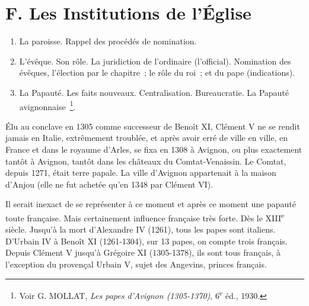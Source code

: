 \documentclass[french,twoside]{book} %
\begin{document}
\section[{F. Les Institutions de l’Église}]{F. Les Institutions de l’Église}
\label{c10f}

\begin{enumerate}[itemsep=0pt,]
\item La paroisse. Rappel des procédés de nomination.
\item L’évêque. Son rôle. La juridiction de l’ordinaire (l’official). Nomination des évêques, l’élection par le chapitre ; le rôle du roi ; et du pape (indications).
\item La Papauté. Les faits nouveaux. Centralisation. Bureaucratie. La Papauté avignonnaise \footnote{ Voir G. MOLLAT, {\itshape Les papes d’Avignon (1305-1370)}, 6\textsuperscript{e} éd., 1930.}.
\end{enumerate}

\noindent Élu au conclave en 1305 comme successeur de Benoît XI, Clément V ne se rendit jamais en Italie, extrêmement troublée, et après  
\label{p113} avoir erré de ville en ville, en France et dans le royaume d’Arles, se fixa en 1308 à Avignon, ou plus exactement tantôt à Avignon, tantôt dans les châteaux du Comtat-Venaissin. Le Comtat, depuis 1271, était terre papale. La ville d’Avignon appartenait à la maison d’Anjou (elle ne fut achetée qu’en 1348 par Clément VI).\par
Il serait inexact de se représenter à ce moment et après ce moment une papauté toute française. Mais certainement influence française très forte. Dès le XIII\textsuperscript{e} siècle. Jusqu’à la mort d’Alexandre IV (1261), tous les papes sont italiens. D’Urbain IV à Benoît XI (1261-1304), sur 13 papes, on compte trois français. Depuis Clément V jusqu’à Grégoire XI (1305-1378), ils sont tous français, à l’exception du provençal Urbain V, sujet des Angevins, princes français.\par
\end{document}

